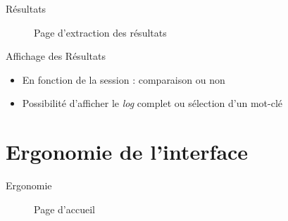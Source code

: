 \documentclass{beamer}
\begin{document}
\begin{frame}{\textcolor{bleu2}{\hspace{1cm}Résultats}}
\begin{figure}
		\begin{center}
			\caption{Page d'extraction des résultats}
		\end{center}
	\end{figure}
	\begin{block}{\hspace{0.2cm}Affichage des Résultats}
		\begin{itemize}
			\item En fonction de la session : comparaison ou non
			\item Possibilité d'afficher le \textit{log} complet ou sélection d'un mot-clé
		\end{itemize}
	\end{block}
\end{frame}

\section{Ergonomie de l'interface}

\begin{frame}{\textcolor{bleu2}{\hspace{1cm} Ergonomie}}
	\begin{figure}
		\begin{center}
			\caption{Page d'accueil}
		\end{center}
	\end{figure}
\end{frame}
\end{document}
